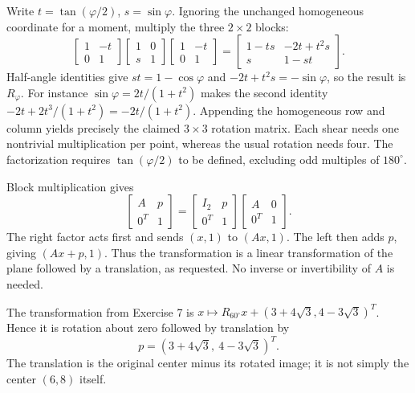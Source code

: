 Write $t=\tan(\varphi/2)$, $s=\sin\varphi$. Ignoring the unchanged
homogeneous coordinate for a moment, multiply the three $2\times2$ blocks:
\[
 \begin{bmatrix}1&-t\\0&1\end{bmatrix}
 \begin{bmatrix}1&0\\s&1\end{bmatrix}
 \begin{bmatrix}1&-t\\0&1\end{bmatrix}
 =\begin{bmatrix}1-ts&-2t+t^2s\\s&1-st\end{bmatrix}.
\]
Half-angle identities give $st=1-\cos\varphi$ and
$-2t+t^2s=-\sin\varphi$, so the result is $R_\varphi$.
For instance $\sin\varphi=2t/(1+t^2)$ makes the second identity
$-2t+2t^3/(1+t^2)=-2t/(1+t^2)$.
Appending the homogeneous row and column yields precisely the claimed
$3\times3$ rotation matrix. Each shear needs one nontrivial multiplication
per point, whereas the usual rotation needs four. The factorization requires
$\tan(\varphi/2)$ to be defined, excluding odd multiples of $180^\circ$.

Block multiplication gives
\[
 \begin{bmatrix}A&p\\0^T&1\end{bmatrix}
 =\begin{bmatrix}I_2&p\\0^T&1\end{bmatrix}
  \begin{bmatrix}A&0\\0^T&1\end{bmatrix}.
\]
The right factor acts first and sends $(x,1)$ to $(Ax,1)$.
The left then adds $p$, giving $(Ax+p,1)$. Thus the transformation is
a linear transformation of the plane followed by a translation, as requested.
No inverse or invertibility of $A$ is needed.

The transformation from Exercise 7 is
$x\mapsto R_{60^\circ}x+(3+4\sqrt3,4-3\sqrt3)^T$.
Hence it is rotation about zero followed by translation by
\[
 \boxed{p=(3+4\sqrt3,\ 4-3\sqrt3)^T}.
\]
The translation is the original center minus its rotated image; it is
not simply the center $(6,8)$ itself.

